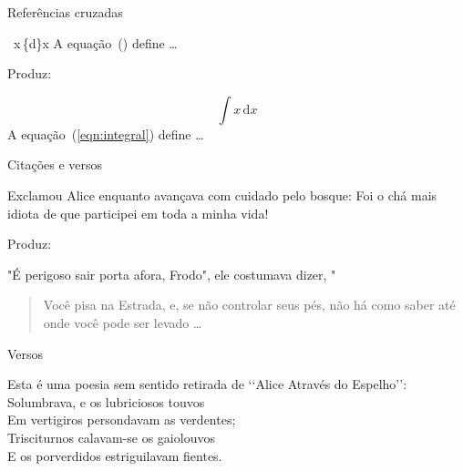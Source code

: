 \begin{frame}{Referências cruzadas}

\begin{LaTeXcode}[Exemplo]
 \n
\string\int\ x\string\,\string\mathrm\{d\}x\n
{}\n
A equação~() define \string\dots
\end{LaTeXcode}

Produz:
\begin{LaTeXoutput}
\begin{equation} \label{eqn:integral}
\int x\,\mathrm{d}x
\end{equation}
A equação~(\ref{eqn:integral}) define \dots
\end{LaTeXoutput}
\end{frame}

\begin{frame}{Citações e versos}
\begin{LaTeXcode}[Exemplo]
Exclamou Alice enquanto avançava com cuidado
pelo bosque:\n
{}\n
Foi o chá mais idiota de que participei em
toda a minha vida!\n
{}
\end{LaTeXcode}

Produz:

\begin{LaTeXoutput}
"É perigoso sair porta afora, Frodo", ele costumava dizer, "
\begin{quote}\normalfont
Você pisa na Estrada, e, se não controlar seus pés, não há como saber até onde você pode ser levado \ldots
\end{quote}
\end{LaTeXoutput}
\end{frame}

\begin{frame}{Versos}
\begin{LaTeXcode}
Esta é uma poesia sem sentido retirada de
`{}`Alice Através do Espelho'{}':
\nn
{}\n
{}\n
{}\n
{}\n
Solumbrava, e os lubriciosos touvos \string\\ \n
Em vertigiros persondavam as verdentes; \string\\ \n
Trisciturnos calavam-se os gaiolouvos \string\\ \n
E os porverdidos estriguilavam fientes.\n
{}
\end{LaTeXcode}
\end{frame}

